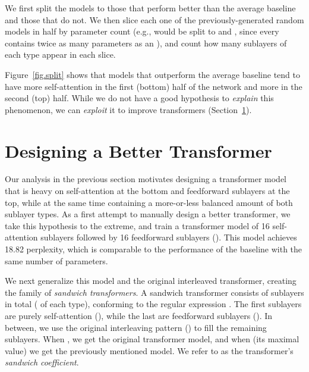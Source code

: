 \documentclass[11pt,a4paper]{article}
\begin{document}
We first split the models to those that perform better than the average baseline and those that do not.
We then slice each one of the previously-generated random models in half by parameter count (e.g., {\Large \texttt{}} would be split to {\Large \texttt{}} and {\Large \texttt{}}, since every {\Large \texttt{}} contains twice as many parameters as an {\Large \texttt{}}), and count how many sublayers of each type appear in each slice.

Figure~\ref{fig.split} shows that models that outperform the average baseline tend to have more self-attention {\Large \texttt{}} in the first (bottom) half of the network and more {\Large \texttt{}} in the second (top) half.
While we do not have a good hypothesis to \emph{explain} this phenomenon, we can \emph{exploit} it to improve transformers (Section~\ref{sec.designing}).




 \section{Designing a Better Transformer} \label{sec.designing}

Our analysis in the previous section motivates designing a transformer model that is heavy on self-attention at the bottom and feedforward sublayers at the top, while at the same time containing a more-or-less balanced amount of both sublayer types.
As a first attempt to manually design a better transformer, we take this hypothesis to the extreme, and train a transformer model of 16 self-attention sublayers followed by 16 feedforward sublayers ({\Large \texttt{}}{\Large \texttt{}}). This model achieves 18.82 perplexity, which is comparable to the performance of the baseline with the same number of parameters.

We next generalize this model and the original interleaved transformer, creating the family of \emph{sandwich transformers}.
A sandwich transformer consists of  sublayers in total ( of each type), conforming to the regular expression {\Large \texttt{}}{\Large \texttt{}}. The first  sublayers are purely self-attention ({\Large \texttt{}}), while the last  are feedforward sublayers ({\Large \texttt{}}). In between, we use the original interleaving pattern ({\Large \texttt{}}) to fill the remaining  sublayers. When , we get the original transformer model, and when  (its maximal value) we get the previously mentioned {\Large \texttt{}}{\Large \texttt{}} model. We refer to  as the transformer's \emph{sandwich coefficient}. 
\end{document}

